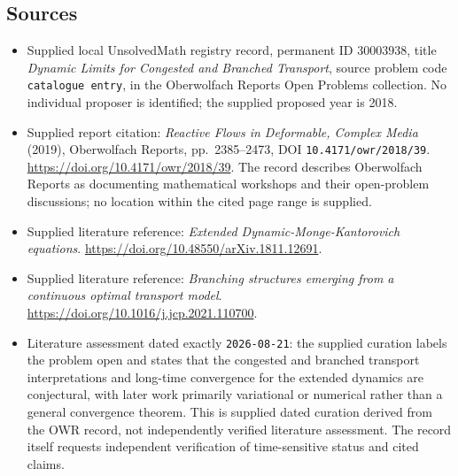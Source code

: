\documentclass[11pt]{article}
\begin{document}
\subsection{Sources}
\begin{itemize}
\item Supplied local UnsolvedMath registry record, permanent ID \(30003938\), title \emph{Dynamic Limits for Congested and Branched Transport}, source problem code \texttt{catalogue entry}, in the Oberwolfach Reports Open Problems collection. No individual proposer is identified; the supplied proposed year is 2018.
\item Supplied report citation: \emph{Reactive Flows in Deformable, Complex Media} (2019), Oberwolfach Reports, pp.~2385--2473, DOI \texttt{10.4171/owr/2018/39}. \url{https://doi.org/10.4171/owr/2018/39}. The record describes Oberwolfach Reports as documenting mathematical workshops and their open-problem discussions; no location within the cited page range is supplied.
\item Supplied literature reference: \emph{Extended Dynamic-Monge-Kantorovich equations}. \url{https://doi.org/10.48550/arXiv.1811.12691}.
\item Supplied literature reference: \emph{Branching structures emerging from a continuous optimal transport model}. \url{https://doi.org/10.1016/j.jcp.2021.110700}.
\item Literature assessment dated exactly \texttt{2026-08-21}: the supplied curation labels the problem open and states that the congested and branched transport interpretations and long-time convergence for the extended dynamics are conjectural, with later work primarily variational or numerical rather than a general convergence theorem. This is supplied dated curation derived from the OWR record, not independently verified literature assessment. The record itself requests independent verification of time-sensitive status and cited claims.
\end{itemize}
\end{document}
